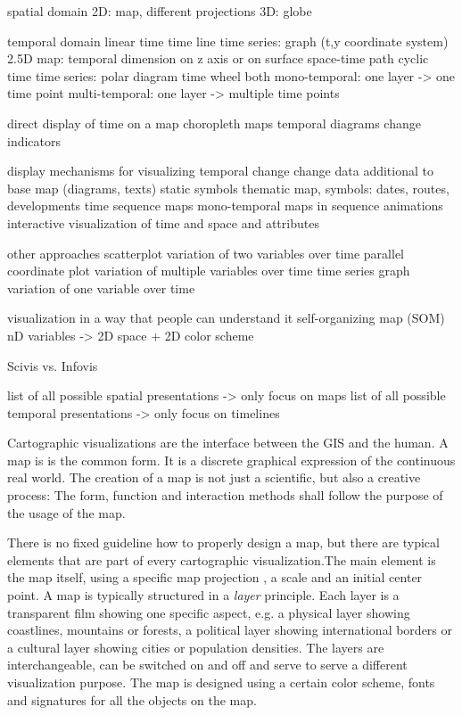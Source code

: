 spatial domain
  2D: map, different projections
  3D: globe

temporal domain
  linear time
    time line
    time series: graph (t,y coordinate system)
    2.5D map: temporal dimension on z axis or on surface
    space-time path
  cyclic time
    time series: polar diagram
    time wheel
  both
    mono-temporal: one layer -> one time point
    multi-temporal: one layer -> multiple time points
\cite[p. 144]{ott2001time}

direct display of time on a map
  choropleth maps
  temporal diagrams
  change indicators

display mechanisms for visualizing temporal change
  change data         additional to base map (diagrams, texts)
  static symbols      thematic map, symbols: dates, routes, developments
  time sequence maps  mono-temporal maps in sequence
  animations          interactive visualization of time and space and attributes
\cite[p. 146-147]{ott2001time}


other approaches
  scatterplot               variation of two variables over time
  parallel coordinate plot  variation of multiple variables over time
  time series graph         variation of one variable over time

visualization in a way that people can understand it
  self-organizing map (SOM) nD variables -> 2D space + 2D color scheme


Scivis vs. Infovis

list of all possible spatial presentations -> only focus on maps
list of all possible temporal presentations -> only focus on timelines

Cartographic visualizations are the interface between the GIS and the human. A map is is the common form. It is a discrete graphical expression of the continuous real world. The creation of a map is not just a scientific, but also a creative process: The form, function and interaction methods shall follow the purpose of the usage of the map.

There is no fixed guideline how to properly design a map, but there are typical elements that are part of every cartographic visualization.The main element is the map itself, using a specific map projection
, a scale and an initial center point. A map is typically structured in a \emph{layer} principle. Each layer is a transparent film showing one specific aspect, e.g. a physical layer showing coastlines, mountains or forests, a political layer showing international borders or a cultural layer showing cities or population densities. The layers are interchangeable, can be switched on and off and serve to serve a different visualization purpose. The map is designed using a certain color scheme, fonts and signatures for all the objects on the map.


